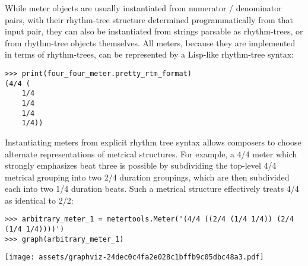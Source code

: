 \noindent While meter objects are usually instantiated from numerator /
denominator pairs, with their rhythm-tree structure determined programmatically
from that input pair, they can also be instantiated from strings parsable as
rhythm-trees, or from rhythm-tree objects themselves. All meters, because they
are implemented in terms of rhythm-trees, can be represented by a Lisp-like
rhythm-tree syntax:

\begin{comment}
<abjad>
print(four_four_meter.pretty_rtm_format)
</abjad>
\end{comment}

\begin{abjadbookoutput}
\begin{singlespacing}
\vspace{-0.5\baselineskip}
\begin{lstlisting}
>>> print(four_four_meter.pretty_rtm_format)
(4/4 (
	1/4
	1/4
	1/4
	1/4))
\end{lstlisting}
\end{singlespacing}
\end{abjadbookoutput}

\noindent Instantiating meters from explicit rhythm tree syntax allows
composers to choose alternate representations of metrical structures. For
example, a 4/4 meter which strongly emphasizes beat three is possible by
subdividing the top-level 4/4 metrical grouping into two 2/4 duration
groupings, which are then subdivided each into two 1/4 duration beats. Such a
metrical structure effectively treats 4/4 as identical to 2/2:

\begin{comment}
<abjad>
arbitrary_meter_1 = metertools.Meter('(4/4 ((2/4 (1/4 1/4)) (2/4 (1/4 1/4))))')
graph(arbitrary_meter_1)
</abjad>
\end{comment}

\begin{abjadbookoutput}
\begin{singlespacing}
\vspace{-0.5\baselineskip}
\begin{lstlisting}
>>> arbitrary_meter_1 = metertools.Meter('(4/4 ((2/4 (1/4 1/4)) (2/4 (1/4 1/4))))')
>>> graph(arbitrary_meter_1)
\end{lstlisting}
\noindent\texttt{[image: assets/graphviz-24dec0c4fa2e028c1bffb9c05dbc48a3.pdf]}
\end{singlespacing}
\end{abjadbookoutput}

